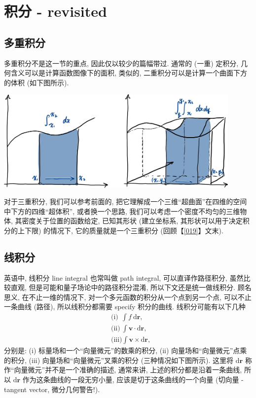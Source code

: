 \section{积分 - revisited}\label{030}

\subsection{多重积分}

多重积分不是这一节的重点, 因此仅以较少的篇幅带过. 通常的 (一重) 定积分,
几何含义可以是计算函数图像下的面积, 类似的,
二重积分可以是计算一个曲面下方的体积 (如下图所示).

\begin{tcolorbox}[size=fbox, breakable, enhanced jigsaw]
    \includegraphics[width=0.9\textwidth]{./img/image-20240530065714806.png}
\end{tcolorbox}

对于三重积分, 我们可以参考前面的,
把它理解成一个三维``超曲面''在四维的空间中下方的四维``超体积'',
或者换一个思路, 我们可以考虑一个密度不均匀的三维物体,
其密度关于位置的函数给定, 已知其形状 (建立坐标系,
其形状可以用于决定积分的上下限) 的情况下, 它的质量就是一个三重积分
(回顾【\ref{019}】文末).

\subsection{线积分}

英语中, 线积分 line integral 也常叫做 path integral, 可以直译作路径积分,
虽然比较直观, 但是可能和量子场论中的路径积分混淆,
所以下文还是统一做线积分. 顾名思义, 在不止一维的情况下,
对一个多元函数的积分从一个点到另一个点, 可以不止一条曲线 (路径),
所以线积分都需要 specify 积分的曲线. 线积分可能有以下几种 \[
\begin{aligned}
&\text{(i)}\ \ \int f\ \mathrm{d}\boldsymbol{r},\\
&\text{(ii)}\ \int\boldsymbol{v}\cdot\mathrm{d}\boldsymbol{r},\\
&\text{(iii)}\int\boldsymbol{v}\times\mathrm{d}\boldsymbol{r},
\end{aligned}
\] 分别是: (i) 标量场和一个``向量微元''的数乘的积分, (ii)
向量场和``向量微元''点乘的积分, (iii) 向量场和``向量微元''叉乘的积分
(三种情况如下图所示). 这里将 $\mathrm{d}\boldsymbol{r}$
称作``向量微元''并不是一个准确的描述, 通常来讲,
上述的积分都是沿着一条曲线, 所以 $\mathrm{d}\boldsymbol{r}$
作为这条曲线的一段无穷小量, 应该是切于这条曲线的一个向量 (切向量 -
tangent vector, 微分几何警告!).

